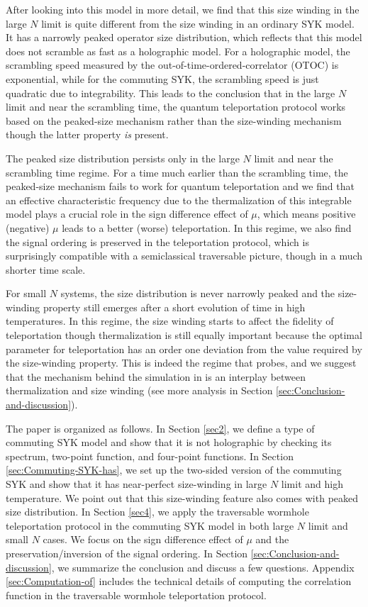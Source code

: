 \documentclass[11pt]{article}
\renewcommand{\>}{\rangle}
\newcommand{\<}{\langle}
\begin{document}
After looking into this model in more detail, we find that this size winding in the large $N$ limit is quite different from the size winding in an ordinary SYK model. It has a narrowly peaked operator size distribution, which reflects that this model does not scramble as fast as a holographic model. For a holographic model, the scrambling speed measured by the out-of-time-ordered-correlator (OTOC) is exponential, while for the commuting SYK, the scrambling speed is just quadratic due to integrability. This leads to the conclusion that in the large $N$ limit and near the scrambling time, the quantum teleportation protocol works based on the peaked-size mechanism \cite{Schuster:2021uvg} rather than the size-winding mechanism though the latter property {\it is} present. 

The peaked size distribution persists only in the large $N$ limit and near the scrambling time regime. For a time much earlier than the scrambling time, the peaked-size mechanism fails to work for quantum teleportation and we find that an effective characteristic frequency due to the thermalization of this integrable model plays a crucial role in the sign difference effect of $\mu$, which means positive (negative) $\mu$ leads to a better (worse) 
 teleportation. In this regime, we also find the signal ordering is preserved in the teleportation protocol, which is surprisingly compatible with a semiclassical traversable picture, though in a much shorter time scale.
 
 For small $N$ systems, the size distribution is never narrowly peaked and the size-winding property still emerges after a short evolution of time in high temperatures. In this regime, the size winding starts to affect the fidelity of teleportation though thermalization is still equally important because the optimal parameter for teleportation has an order one deviation from the value required by the size-winding property. This is indeed the regime that \cite{Jafferis:2022crx} probes, and we suggest that the mechanism behind the simulation in \cite{Jafferis:2022crx} is an interplay between thermalization and size winding (see more analysis in Section \ref{sec:Conclusion-and-discussion}).

The paper is organized as follows. In Section \ref{sec2}, we define a type of commuting SYK model and show that it is not holographic by checking its spectrum, two-point function, and four-point functions. In Section \ref{sec:Commuting-SYK-has}, we set up the two-sided version of the commuting SYK and show that it has near-perfect size-winding in large $N$ limit and high temperature. We point out that this size-winding feature also comes with peaked size distribution. In Section \ref{sec4}, we apply the traversable wormhole teleportation protocol in the commuting SYK model in both large $N$ limit and small $N$ cases. We focus on the sign difference effect of $\mu$ and the preservation/inversion of the signal ordering. In Section  \ref{sec:Conclusion-and-discussion}, we summarize the conclusion and discuss a few questions. Appendix \ref{sec:Computation-of} includes the technical details of computing the correlation function in the traversable wormhole teleportation protocol.
\end{document}

